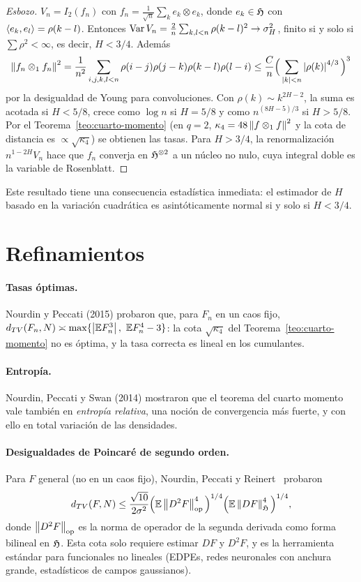 \begin{proof}[Esbozo]
$V_n=I_2(f_n)$ con $f_n=\frac1{\sqrt n}\sum_ke_k\otimes e_k$, donde $e_k\in\mathfrak{H}$ con $\left\langle e_k, e_l\right\rangle=\rho(k-l)$. Entonces
$\operatorname{Var} V_n=\frac2n\sum_{k,l<n}\rho(k-l)^2\to\sigma_H^2$, finito si y solo si $\sum\rho^2<\infty$, es decir, $H<3/4$. Además
\[
  \left\lVert f_n\otimes_1f_n\right\rVert^2=\frac1{n^2}\sum_{i,j,k,l<n}\rho(i-j)\rho(j-k)\rho(k-l)\rho(l-i)\le\frac Cn\Big(\sum_{\left\lvert k\right\rvert<n}\left\lvert \rho(k)\right\rvert^{4/3}\Big)^3
\]
por la desigualdad de Young para convoluciones. Con $\rho(k)\sim k^{2H-2}$, la suma es acotada si
$H<5/8$, crece como $\log n$ si $H=5/8$ y como $n^{(8H-5)/3}$ si $H>5/8$. Por el Teorema~\ref{teo:cuarto-momento} (en
$q=2$, $\kappa_4=48\left\lVert f\otimes_1f\right\rVert^2$ y la cota de distancia es $\propto\sqrt{\kappa_4}$) se obtienen las tasas. Para $H>3/4$,
la renormalización $n^{1-2H}V_n$ hace que $f_n$ converja en $\mathfrak{H}^{\otimes2}$ a un núcleo no nulo, cuya integral
doble es la variable de Rosenblatt.
\end{proof}

Este resultado tiene una consecuencia estadística inmediata: el estimador de $H$ basado en
la variación cuadrática es asintóticamente normal si y solo si $H<3/4$.

\section{Refinamientos}

\paragraph{Tasas óptimas.} Nourdin y Peccati (2015) probaron que, para $F_n$ en un caos fijo, $d_{TV}(F_n,N)\asymp
\max\{\left\lvert \mathbb{E} F_n^3\right\rvert,\ \mathbb{E} F_n^4-3\}$: la cota $\sqrt{\kappa_4}$ del Teorema~\ref{teo:cuarto-momento} no es óptima, y la tasa correcta es lineal
en los cumulantes.

\paragraph{Entropía.} Nourdin, Peccati y Swan (2014) mostraron que el teorema del cuarto momento
vale también en \emph{entropía relativa}, una noción de convergencia más fuerte, y con ello en total
variación de las densidades.

\paragraph{Desigualdades de Poincaré de segundo orden.} Para $F$ general (no en un caos fijo),
Nourdin, Peccati y Reinert~\cite{NourdinPeccatiReinert09} probaron
\[
  d_{TV}(F,N)\le\frac{\sqrt{10}}{2\sigma^2}\Big(\mathbb{E}\left\lVert D^2F\right\rVert^4_{\mathrm{op}}\Big)^{1/4}\Big(\mathbb{E}\left\lVert DF\right\rVert^4_{\mathfrak{H}}\Big)^{1/4},
\]
donde $\left\lVert D^2F\right\rVert_{\mathrm{op}}$ es la norma de operador de la segunda derivada como forma bilineal en $\mathfrak{H}$. Esta
cota solo requiere estimar $DF$ y $D^2F$, y es la herramienta estándar para funcionales no lineales
(EDPEs, redes neuronales con anchura grande, estadísticos de campos gaussianos).

